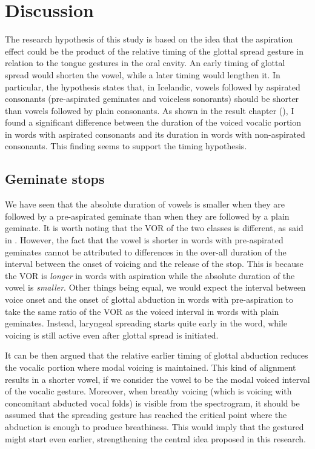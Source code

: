 \documentclass[11pt,a4paper,openany]{memoir}\usepackage[]{graphicx}\usepackage[]{color}
\begin{document}
\chapter{Discussion}

The research hypothesis of this study is based on the idea that the aspiration effect could be the product of the relative timing of the glottal spread gesture in relation to the tongue gestures in the oral cavity.
An early timing of glottal spread would shorten the vowel, while a later timing would lengthen it.
In particular, the hypothesis states that, in Icelandic, vowels followed by aspirated consonants (pre-aspirated geminates and voiceless sonorants) should be shorter than vowels followed by plain consonants.
As shown in the result chapter (), I found a significant difference between the duration of the voiced vocalic portion in words with aspirated consonants and its duration in words with non-aspirated consonants.
This finding seems to support the timing hypothesis.

\section{Geminate stops}
We have seen that the absolute duration of vowels is smaller when they are followed by a pre-aspirated geminate than when they are followed by a plain geminate.
It is worth noting that the VOR of the two classes is different, as said in .
However, the fact that the vowel is shorter in words with pre-aspirated geminates cannot be attributed to differences in the over-all duration of the interval between the onset of voicing and the release of the stop.
This is because the VOR is \textit{longer} in words with aspiration while the absolute duration of the vowel is \textit{smaller}.
Other things being equal, we would expect the interval between voice onset and the onset of glottal abduction in words with pre-aspiration to take the same ratio of the VOR as the voiced interval in words with plain geminates.
Instead, laryngeal spreading starts quite early in the word, while voicing is still active even after glottal spread is initiated.

It can be then argued that the relative earlier timing of glottal abduction reduces the vocalic portion where modal voicing is maintained.
This kind of alignment results in a shorter vowel, if we consider the vowel to be the modal voiced interval of the vocalic gesture.
Moreover, when breathy voicing (which is voicing with concomitant abducted vocal folds) is visible from the spectrogram, it should be assumed that the spreading gesture has reached the critical point where the abduction is enough to produce breathiness.
This would imply that the gestured might start even earlier, strengthening the central idea proposed in this research.
\end{document}
